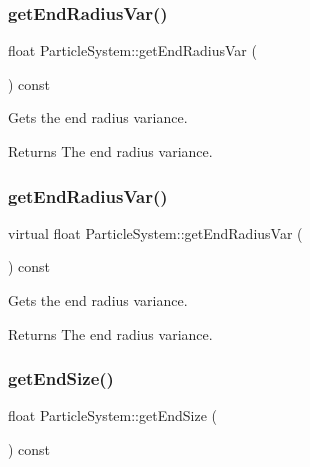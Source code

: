 \subsubsection{\texorpdfstring{get\+End\+Radius\+Var()}{getEndRadiusVar()}\hspace{0.1cm}{\footnotesize\ttfamily [1/2]}}
{\footnotesize\ttfamily float Particle\+System\+::get\+End\+Radius\+Var (\begin{DoxyParamCaption}{ }\end{DoxyParamCaption}) const\hspace{0.3cm}{\ttfamily [virtual]}}

Gets the end radius variance.

\begin{DoxyReturn}{Returns}
The end radius variance. 
\end{DoxyReturn}
\mbox{\label{classParticleSystem_a1991336eec162ea4a76b47b6a8ef13d8}} 
\subsubsection{\texorpdfstring{get\+End\+Radius\+Var()}{getEndRadiusVar()}\hspace{0.1cm}{\footnotesize\ttfamily [2/2]}}
{\footnotesize\ttfamily virtual float Particle\+System\+::get\+End\+Radius\+Var (\begin{DoxyParamCaption}{ }\end{DoxyParamCaption}) const\hspace{0.3cm}{\ttfamily [virtual]}}

Gets the end radius variance.

\begin{DoxyReturn}{Returns}
The end radius variance. 
\end{DoxyReturn}
\mbox{\label{classParticleSystem_a8366ad864f3b29ad8fd0f436934cad9e}} 
\subsubsection{\texorpdfstring{get\+End\+Size()}{getEndSize()}\hspace{0.1cm}{\footnotesize\ttfamily [1/2]}}
{\footnotesize\ttfamily float Particle\+System\+::get\+End\+Size (\begin{DoxyParamCaption}{ }\end{DoxyParamCaption}) const\hspace{0.3cm}{\ttfamily [inline]}}

